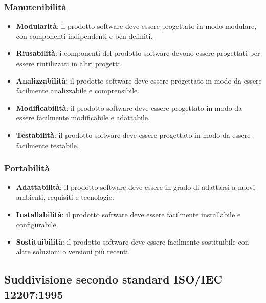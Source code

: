 \subsubsection{Manutenibilità}
\begin{itemize}
    \item \textbf{Modularità}: il prodotto software deve essere progettato in modo modulare, con componenti indipendenti e ben definiti.
    \item \textbf{Riusabilità}: i componenti del prodotto software devono essere progettati per essere riutilizzati in altri progetti.
    \item \textbf{Analizzabilità}: il prodotto software deve essere progettato in modo da essere facilmente analizzabile e comprensibile.
    \item \textbf{Modificabilità}: il prodotto software deve essere progettato in modo da essere facilmente modificabile e adattabile.
    \item \textbf{Testabilità}: il prodotto software deve essere progettato in modo da essere facilmente testabile.
\end{itemize}
\subsubsection{Portabilità}
\begin{itemize}
    \item \textbf{Adattabilità}: il prodotto software deve essere in grado di adattarsi a nuovi ambienti, requisiti e tecnologie.
    \item \textbf{Installabilità}: il prodotto software deve essere facilmente installabile e configurabile.
    \item \textbf{Sostituibilità}: il prodotto software deve essere facilmente sostituibile con altre soluzioni o versioni più recenti.
\end{itemize}
\newpage
\subsection{Suddivisione secondo standard ISO/IEC 12207:1995}
